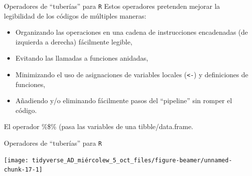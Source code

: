 \documentclass[
  ignorenonframetext,
  aspectratio=169]{beamer}
\newenvironment{Shaded}{\begin{snugshade}}{\end{snugshade}}
\newcommand{\AttributeTok}[1]{\textcolor[rgb]{0.77,0.63,0.00}{#1}}
\newcommand{\DecValTok}[1]{\textcolor[rgb]{0.00,0.00,0.81}{#1}}
\newcommand{\FunctionTok}[1]{\textcolor[rgb]{0.00,0.00,0.00}{#1}}
\newcommand{\NormalTok}[1]{#1}
\newcommand{\SpecialCharTok}[1]{\textcolor[rgb]{0.00,0.00,0.00}{#1}}
\begin{document}
\begin{frame}[fragile]{Operadores de ``tuberías'' para \texttt{R}}
\protect\hypertarget{operadores-de-tuberuxedas-para-r-1}{}
Estos operadores pretenden mejorar la legibilidad de los códigos de
múltiples maneras:

\begin{itemize}
\item
  Organizando las operaciones en una cadena de instrucciones encadenadas
  (de izquierda a derecha) fácilmente legible,
\item
  Evitando las llamadas a funciones anidadas,
\item
  Minimizando el uso de asignaciones de variables locales
  (\texttt{\textless{}-}) y definiciones de funciones,
\item
  Añadiendo y/o eliminando fácilmente pasos del ``pipeline'' sin romper
  el código.
\end{itemize}

El operador \%\$\% (pasa las variables de una tibble/data.frame.

\begin{Shaded}
\end{Shaded}
\end{frame}

\begin{frame}[fragile]{Operadores de ``tuberías'' para \texttt{R}}
\protect\hypertarget{operadores-de-tuberuxedas-para-r-2}{}
\begin{Shaded}
\end{Shaded}

\begin{center}\texttt{[image: tidyverse\_AD\_miércolew\_5\_oct\_files/figure-beamer/unnamed-chunk-17-1]} \end{center}
\end{frame}
\end{document}
